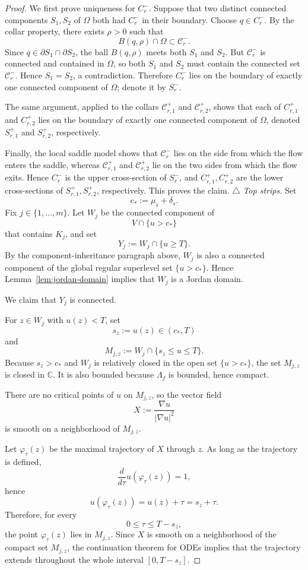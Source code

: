 \documentclass[12pt]{amsart}
\theoremstyle{definition}
\theoremstyle{remark}
\begin{document}
\begin{proof}
We first prove uniqueness for $C_r^-$. Suppose that two distinct connected components
$S_1,S_2$ of $\Omega$ both had $C_r^-$ in their boundary. Choose $q\in C_r^-$. By the
collar property, there exists $\rho>0$ such that
\[
B(q,\rho)\cap\Omega \subset \mathcal C_r^-.
\]
Since $q\in \partial S_1 \cap \partial S_2$, the ball $B(q,\rho)$ meets both $S_1$ and
$S_2$. But $\mathcal C_r^-$ is connected and contained in $\Omega$, so both $S_1$ and
$S_2$ must contain the connected set $\mathcal C_r^-$. Hence $S_1=S_2$, a contradiction.
Therefore $C_r^-$ lies on the boundary of exactly one connected component of $\Omega$;
denote it by $S_r^-$.

The same argument, applied to the collars $\mathcal C_{r,1}^+$ and $\mathcal C_{r,2}^+$,
shows that each of $C_{r,1}^+$ and $C_{r,2}^+$ lies on the boundary of exactly one
connected component of $\Omega$, denoted $S_{r,1}^+$ and $S_{r,2}^+$, respectively.

Finally, the local saddle model shows that $\mathcal C_r^-$ lies on the side from which
the flow enters the saddle, whereas $\mathcal C_{r,1}^+$ and $\mathcal C_{r,2}^+$ lie on
the two sides from which the flow exits. Hence $C_r^-$ is the upper cross-section of
$S_r^-$, and $C_{r,1}^+, C_{r,2}^+$ are the lower cross-sections of $S_{r,1}^+, S_{r,2}^+$,
respectively. This proves the claim.
\hfill$\triangle$
\smallskip
\noindent\emph{Top strips.}
Set
\[
c_*:=\mu_s+\delta_s.
\]
Fix $j\in\{1,\dots,m\}$. Let $W_j$ be the connected component of
\[
V\cap\{u>c_*\}
\]
that contains $K_j$, and set
\[
Y_j:=W_j\cap\{u\ge T\}.
\]
By the component-inheritance paragraph above, $W_j$ is also a connected component of the global regular superlevel set $\{u>c_*\}$. Hence Lemma~\ref{lem:jordan-domain} implies that $W_j$ is a Jordan domain.

We claim that $Y_j$ is connected.

For $z\in W_j$ with $u(z)<T$, set
\[
s_z:=u(z)\in(c_*,T)
\]
and
\[
M_{j,z}:=W_j\cap\{s_z\le u\le T\}.
\]
Because $s_z>c_*$ and $W_j$ is relatively closed in the open set $\{u>c_*\}$, the set
$M_{j,z}$ is closed in $\mathbb C$. It is also bounded because $\Lambda_f$ is bounded,
hence compact.

There are no critical points of $u$ on $M_{j,z}$, so the vector field
\[
X:=\frac{\nabla u}{|\nabla u|^2}
\]
is smooth on a neighborhood of $M_{j,z}$.

Let $\varphi_\tau(z)$ be the maximal trajectory of $X$ through $z$. As long as the
trajectory is defined,
\[
\frac{d}{d\tau}u(\varphi_\tau(z))=1,
\]
hence
\[
u(\varphi_\tau(z))=u(z)+\tau=s_z+\tau.
\]
Therefore, for every
\[
0\le \tau\le T-s_z,
\]
the point $\varphi_\tau(z)$ lies in $M_{j,z}$. Since $X$ is smooth on a neighborhood of the
compact set $M_{j,z}$, the continuation theorem for ODEs implies that the trajectory extends
throughout the whole interval $[0,T-s_z]$.


\end{proof}
\end{document}
